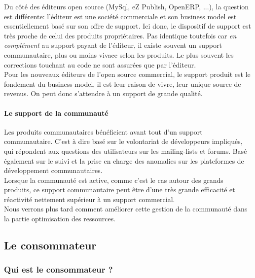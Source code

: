 				Du côté des éditeurs open source (MySql, eZ Publish, OpenERP, ...), la question est différente: l'éditeur est une société commerciale et son business model est essentiellement basé sur son offre de support. Ici donc, le dispositif de support est très proche de celui des produits propriétaires. Pas identique toutefois car \textit{en complément} au support payant de l'éditeur, il existe souvent un support communautaire, plus ou moins vivace selon les produits. Le plus souvent les corrections touchant au code ne sont assurées que par l'éditeur.\\

				Pour les nouveaux éditeurs de l'open source commercial, le support produit est le fondement du business model, il est leur raison de vivre, leur unique source de revenus. On peut donc s'attendre à un support de grande qualité.

				\paragraph{Le support de la communauté\\}

				Les produits communautaires bénéficient avant tout d'un support communautaire. C'est à dire basé sur le volontariat de développeurs impliqués, qui répondent aux questions des utilisateurs sur les mailing-lists et forums. Basé également sur le suivi et la prise en charge des anomalies sur les plateformes de développement communautaires.\\

				Lorsque la communauté est active, comme c'est le cas autour des grands produits, ce support communautaire peut être d'une très grande efficacité et réactivité nettement supérieur à un support commercial.\\

				Nous verrons plus tard comment améliorer cette gestion de la communauté dans la partie optimisation des ressources.

		\subsection{Le consommateur}

			\subsubsection{Qui est le consommateur ?}

